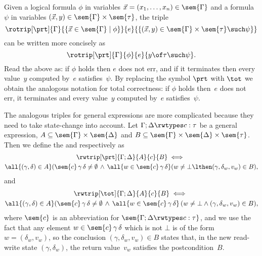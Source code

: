 Given a logical formula $\phi$ in variables $\vec{x} = (x_1, \ldots, x_n) \in \sem{\Gamma}$ and a formula $\psi$ in variables $(\vec{x}, y) \in \sem{\Gamma} \times \sem{\tau}$, the triple
%
\begin{equation*}
  \rotrip[\prt]
  {\Gamma} {\{\vec{x} \in \sem{\Gamma} \mid \phi\}}
  {e}
  {\{(\vec{x}, y) \in \sem{\Gamma} \times \sem{\tau} \such \psi\}}
\end{equation*}
%
can be written more concisely as
%
\begin{equation}
  \label{eq:notation-rotrip}
  \rotrip[\prt]{\Gamma} {\phi} {e} {y \of \tau \such \psi}.
\end{equation}
%
Read the above as: if $\phi$ holds then $e$ does not err, and if it terminates then every value~$y$ computed by~$e$ satisfies~$\psi$. By replacing the symbol $\prt$ with $\tot$ we obtain the analogous notation for total correctness: if $\phi$ holds then~$e$ does not err, it terminates and every value~$y$ computed by~$e$ satisfies~$\psi$.

The analogous triples for general expressions are more complicated because they need to take state-change into account. Let $\Gamma; \Delta \rwtypes c : \tau$ be a general expression, $A \subseteq \sem{\Gamma} \times \sem{\Delta}$ and $B \subseteq \sem{\Gamma} \times  \sem{\Delta} \times \sem{\tau}$. Then we define the  and  respectively as
%
\begin{multline*}
  \rwtrip[\prt] {\Gamma; \Delta} {A} {c} {B} \iff {} \\
  \all{(\gamma, \delta) \in A}
  (\sem{c} \, \gamma \, \delta \neq \emptyset  \, \land\,
  \all{w \in \sem{c} \, \gamma \, \delta} 
  (w \neq \bot \lthen (\gamma, \delta_w,v_w) \in B),
\end{multline*}
%
and
%
\begin{multline*}
  \rwtrip[\tot] {\Gamma; \Delta} {A} {c} {B} \iff {} \\
  \all{(\gamma, \delta) \in A}
  (\sem{c} \, \gamma \, \delta \neq \emptyset  \, \land\,
  \all{w \in \sem{c} \, \gamma \, \delta} \,
  (w \neq \bot \land (\gamma, \delta_w,v_w) \in B), 
\end{multline*}
%
where $\sem{c}$ is an abbreviation for $\sem{\Gamma; \Delta \rwtypes c : \tau}$, and we use the fact that
any element $w \in \sem{c} \, \gamma \, \delta$ which is not $\bot$ is of the form $w = (\delta_w,v_w)$, so the conclusion 
$(\gamma, \delta_w,v_w) \in B$ states that, in the new read-write state $(\gamma, \delta_w)$, the return value~$v_w$ satisfies the postcondition~$B$.

